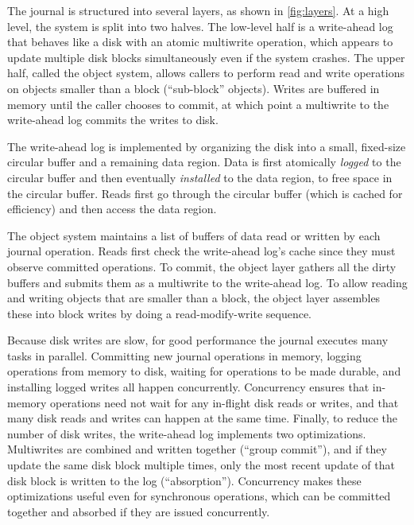 The journal is structured into several layers, as shown in \autoref{fig:layers}.
At a high level, the system is split into two halves. The low-level half is a
write-ahead log that behaves like a disk with an atomic multiwrite operation,
which appears to update multiple disk blocks simultaneously even if the system
crashes. The upper half, called the object system,
allows callers to perform read and write operations on objects
smaller than a block (``sub-block'' objects).  Writes are
buffered in memory until the caller chooses to commit, at which point a multiwrite to the
write-ahead log commits the writes to disk.

The write-ahead log is implemented by organizing the disk into a small,
fixed-size circular buffer and a remaining data region. Data is first atomically
\emph{logged} to the circular buffer and then eventually \emph{installed}
to the data region, to free space in the circular buffer. Reads first go through
the circular buffer (which is cached for efficiency) and then access the data
region.

The object system maintains a list of buffers of data read or written by each journal operation.
Reads first check the write-ahead log's cache since
they must observe committed operations. To commit, the object
layer gathers all the dirty buffers and submits them as a multiwrite to the
write-ahead log. To allow reading and writing objects that are smaller than a
block, the object layer assembles these into block writes by doing a
read-modify-write sequence.

Because disk writes are slow, for good performance the journal executes many
tasks in parallel. Committing new journal operations in memory, logging operations
from memory to disk, waiting for operations to be made durable, and
installing logged writes all happen concurrently.  Concurrency ensures that
in-memory operations
need not wait for any in-flight disk reads or writes, and that many
disk reads and writes can happen at the same time.  Finally, to reduce the
number of disk writes, the write-ahead log implements two optimizations.
Multiwrites are combined and written
together (``group commit''), and if they update the same disk
block multiple times, only the most recent update of that disk block is
written to the log (``absorption''). Concurrency makes these optimizations
useful even for synchronous operations, which can be committed together and
absorbed if they are issued concurrently.

